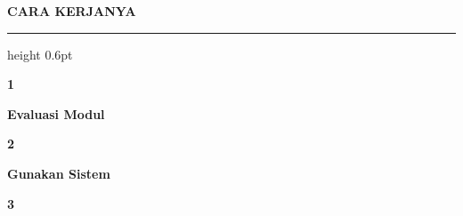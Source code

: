 \documentclass[a4paper]{article}
\newcommand{\sectiontitle}[1]{%
    \vspace{10pt}%
    {\fontsize{13}{16}\selectfont\bfseries\color{BlueDark} #1}\par\vspace{3pt}%
    {\color{BluePrimary}\hrule height 0.6pt}\par\vspace{8pt}%
}
\begin{document}
\vspace{8pt}

\sectiontitle{CARA KERJANYA}

\begin{center}
\begin{minipage}[t]{0.23\textwidth}
    \colorbox{EmeraldBg}{%
        \begin{minipage}[t][3.45cm][c]{\dimexpr\linewidth-2\fboxsep\relax}
            \begin{center}{\fontsize{20}{24}\selectfont\bfseries\color{EmeraldPrimary} 1}\end{center}\vspace{2pt}
            \begin{center}{\fontsize{9.5}{12}\selectfont\bfseries\color{EmeraldDark} Evaluasi Modul}\par{}\end{center}
        \end{minipage}}%
\end{minipage}%
\hfill
\begin{minipage}[t]{0.23\textwidth}
    \colorbox{BlueBg}{%
        \begin{minipage}[t][3.45cm][c]{\dimexpr\linewidth-2\fboxsep\relax}
            \begin{center}{\fontsize{20}{24}\selectfont\bfseries\color{BluePrimary} 2}\end{center}\vspace{2pt}
            \begin{center}{\fontsize{9.5}{12}\selectfont\bfseries\color{BlueDark} Gunakan Sistem}\par{}\end{center}
        \end{minipage}}%
\end{minipage}%
\hfill
\begin{minipage}[t]{0.23\textwidth}
    \colorbox{PurpleBg}{%
        \begin{minipage}[t][3.45cm][c]{\dimexpr\linewidth-2\fboxsep\relax}
            \begin{center}{\fontsize{20}{24}\selectfont\bfseries\color{PurplePrimary} 3}\end{center}\vspace{2pt}

\end{minipage}}
\end{minipage}
\end{center}
\end{document}
